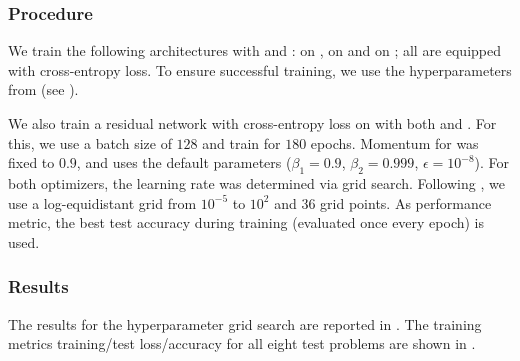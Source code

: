 \subsubsection{Procedure}

We train the following \deepobs \citep{schneider2019deepobs} architectures with
\sgd and \adam: \threecthreed on \cifarten{}, \twoctwod on \fmnist{} and
\allcnnc on \cifarhun{}; all are equipped with cross-entropy loss. To ensure
successful training, we use the hyperparameters from \cite{dangel2020backpack}
(see ).

We also train a residual network \resnetthirtytwo \cite{he2016deep} with
cross-entropy loss on \cifarten{} with both \sgd and \adam{}. For this, we use a
batch size of $128$ and train for $180$ epochs. Momentum for \sgd was fixed to
$0.9$, and \adam uses the default parameters ($\beta_1 = 0.9$, $\beta_2 =
0.999$, $\epsilon = 10^{-8}$). For both optimizers, the learning rate was
determined via grid search. Following \citep{schneider2019deepobs}, we use a
log-equidistant grid from $10^{-5}$ to $10^2$ and $36$ grid points. As
performance metric, the best test accuracy during training (evaluated once every
epoch) is used.

\subsubsection{Results}

The results for the hyperparameter grid search are reported in
. The training metrics training/test
loss/accuracy for all eight test problems are shown in
.

